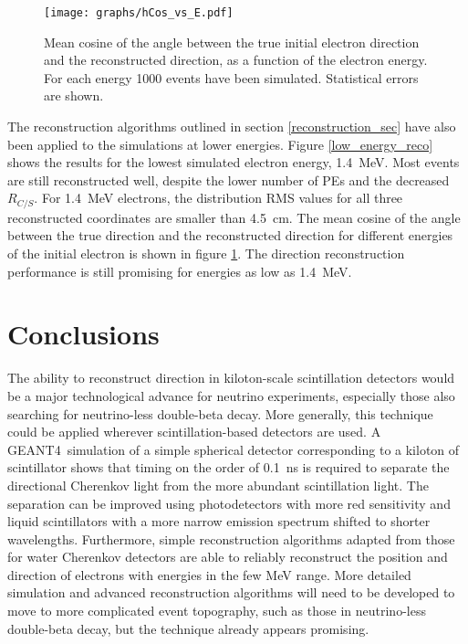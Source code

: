 \documentclass[cits]{JINST}
\newcommand{\GEANT}{GEANT4}
\begin{document}
\begin{figure}
        \begin{center}
        \texttt{[image: graphs/hCos\_vs\_E.pdf]}
        \caption[]{Mean cosine of the angle between the true initial electron direction and the reconstructed direction, as a function of the electron energy. For each energy 1000 events have been simulated. Statistical errors are
shown. \label{Edep_angle}}
        \end{center}
\end{figure}

The reconstruction algorithms outlined in section \ref{reconstruction_sec} have also been applied
to the simulations at lower energies. Figure \ref{low_energy_reco} shows the results for 
the lowest simulated electron energy, 1.4~MeV. Most events are still reconstructed well, despite the lower
number of PEs and the decreased $R_{C/S}$. For 1.4~MeV electrons, the distribution RMS values for all three
reconstructed coordinates are smaller than 4.5~cm. The mean cosine of the angle between the true direction
and the reconstructed direction for different energies of the initial electron is shown in figure
\ref{Edep_angle}. The direction reconstruction performance is still promising for energies as low as 1.4~MeV.

\section{Conclusions}
The ability to reconstruct direction in kiloton-scale scintillation
detectors would be a major technological advance for neutrino
experiments, especially those also
searching for neutrino-less double-beta decay. More generally, this technique could
be applied wherever scintillation-based detectors are used. A \GEANT~simulation of a simple spherical detector corresponding to a kiloton
of scintillator shows that timing on the order of 0.1~ns is required
to separate the directional Cherenkov light from the more abundant
scintillation light. The separation can be improved using
photodetectors with more red sensitivity and liquid scintillators with
a more narrow emission spectrum shifted to shorter
wavelengths. Furthermore, simple reconstruction algorithms adapted
from those for water Cherenkov detectors are able to reliably
reconstruct the position and direction of electrons with energies in the few MeV range.
More detailed simulation and advanced reconstruction algorithms will need
to be developed to move to more complicated event
topography, such as those in neutrino-less double-beta decay, but the technique already
appears promising.
\end{document}
